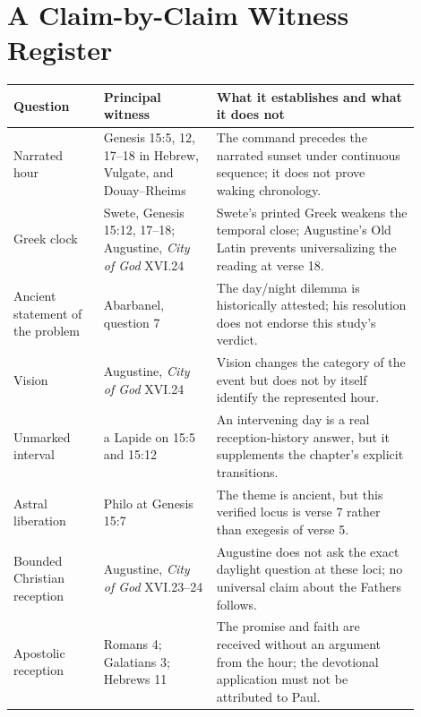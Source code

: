 \section{A Claim-by-Claim Witness Register}

\begin{longtable}{>{\raggedright\arraybackslash}p{0.20\linewidth}>{\raggedright\arraybackslash}p{0.25\linewidth}>{\raggedright\arraybackslash}p{0.45\linewidth}}
\toprule
\textbf{Question} & \textbf{Principal witness} & \textbf{What it establishes and what it does not}\\
\midrule
\endhead
Narrated hour & Genesis 15:5, 12, 17--18 in Hebrew, Vulgate, and
Douay--Rheims & The command precedes the narrated sunset under continuous
sequence; it does not prove waking chronology.\\
Greek clock & Swete, Genesis 15:12, 17--18; Augustine,
\emph{City of God} XVI.24 & Swete's printed Greek weakens the temporal close;
Augustine's Old Latin prevents universalizing the reading at verse 18.\\
Ancient statement of the problem & Abarbanel, question 7 & The day/night
dilemma is historically attested; his resolution does not endorse this
study's verdict.\\
Vision & Augustine, \emph{City of God} XVI.24 & Vision changes the category of
the event but does not by itself identify the represented hour.\\
Unmarked interval & a Lapide on 15:5 and 15:12 & An intervening day is a real
reception-history answer, but it supplements the chapter's explicit
transitions.\\
Astral liberation & Philo at Genesis 15:7 & The theme is ancient, but this
verified locus is verse 7 rather than exegesis of verse 5.\\
Bounded Christian reception & Augustine, \emph{City of God} XVI.23--24 &
Augustine does not ask the exact daylight question at these loci; no universal
claim about the Fathers follows.\\
Apostolic reception & Romans 4; Galatians 3; Hebrews 11 & The promise and
faith are received without an argument from the hour; the devotional
application must not be attributed to Paul.\\
\bottomrule
\end{longtable}

